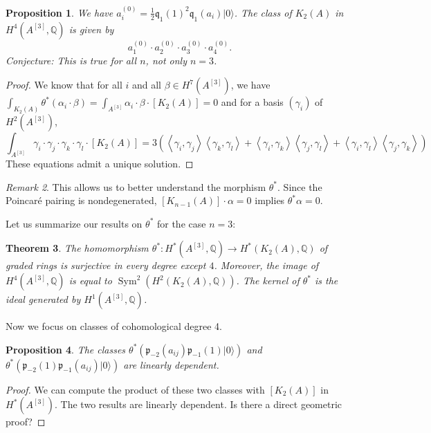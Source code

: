 \documentclass{amsart}
\DeclareMathOperator{\Sym}{Sym}
\newcommand{\hilb}[1]{^{[#1]}}
\newcommand{\vac}{|0\rangle}
\newcommand{\p}{\mathfrak{p}}
\newcommand{\pone}{ \mathfrak{p}_{ - 1} }
\newcommand{\kum}[2]{K_{ #2 }( #1 )}
\newcommand{\Q}{\mathbb{Q}}
\newcommand{\kq}{\mathfrak{q}}
\theoremstyle{plain}
\newtheorem{theorem}{Theorem}[section]
\newtheorem{proposition}[theorem]{Proposition}
\theoremstyle{definition}
\theoremstyle{remark}
\newtheorem{remark}[theorem]{Remark}
\begin{document}
\begin{proposition}
We have $a_i^{(0)}= \frac{1}{2}\kq_1(1)^2\kq_1(a_i)\vac$. The class of $\kum{A}{2}$ in $H^4(A\hilb{3},\Q)$ is given by
$$
a_1^{(0)}\cdot a_2^{(0)}\cdot a_3^{(0)}\cdot a_4^{(0)}.
$$ 
Conjecture: This is true for all $n$, not only $n=3$.
\end{proposition}
\begin{proof}
We know that for all $i$ and all $\beta\in H^7(A\hilb{3})$, we have $\int_ {\kum{A}{2}}\theta^*(\alpha_i\cdot\beta) = \int_ {A\hilb{3}}\alpha_i\cdot\beta \cdot[\kum{A}{2}]= 0$ and
for a basis $(\gamma_i) $ of  $H^2(A\hilb{3})$,
$$
\int_ {A\hilb{3}}\gamma_i\cdot\gamma_j\cdot\gamma_k\cdot\gamma_l\cdot[\kum{A}{2}] =
 3\left(\left<\gamma_i,\gamma_j\right>\left<\gamma_k,\gamma_l\right>+\left<\gamma_i,\gamma_k\right>\left<\gamma_j,\gamma_l\right>+\left<\gamma_i,\gamma_l\right>\left<\gamma_j,\gamma_k\right>  \right)
$$
These equations admit a unique solution.
\end{proof}
\begin{remark}
This allows us to better understand the morphism $\theta^*$. Since the Poincar\'e pairing is nondegenerated, $[\kum{A}{n-1}]\cdot \alpha=0$ implies $\theta^* \alpha =0$.
\end{remark}
Let us summarize our results on $\theta^*$ for the case $n=3$:
\begin{theorem}
The homomorphism $\theta^* : H^*(A\hilb{3},\Q)\rightarrow H^*(\kum{A}{2},\Q)$ of graded rings is surjective in every degree except $4$. Moreover, the image of $H^4(A\hilb{3},\Q)$ is equal to $\Sym^2(H^2(\kum{A}{2},\Q))$. 
The kernel of $\theta^*$ is the ideal generated by $H^1(A\hilb{3},\Q)$.
\end{theorem}


Now we focus on classes of cohomological degree 4.
\begin{proposition}
The classes $\theta^* \left(\p_{-2}(a_{ij})\pone(1)\vac\right) $ and $\theta^*\left( \p_{-2}(1)\pone(a_{ij})\vac\right) $ are linearly dependent.
\end{proposition}
\begin{proof}
We can compute the product of these two classes with $[ \kum{A}{2} ] $ in $H^*(A\hilb{3})$. The two results are linearly dependent. Is there a direct geometric proof?
\end{proof}
\end{document}
